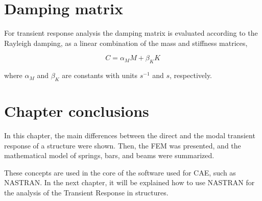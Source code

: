 \section{Damping matrix}

For transient response analysis the damping matrix is evaluated according to the Rayleigh damping, as a linear combination of the mass and stiffness matrices,

\begin{equation}
    C = \alpha_M M + \beta_K K
\end{equation}

where $\alpha_M$ and $\beta_K$ are constants with units $s^{-1}$ and $s$, respectively.

\section{Chapter conclusions}

In this chapter, the main differences between the direct and the modal transient response of a structure were shown. Then, the FEM was presented, and the mathematical model of springs, bars, and beams were summarized.

These concepts are used in the core of the software used for CAE, such as NASTRAN. In the next chapter, it will be explained how to use NASTRAN for the analysis of the Transient Response in structures.
